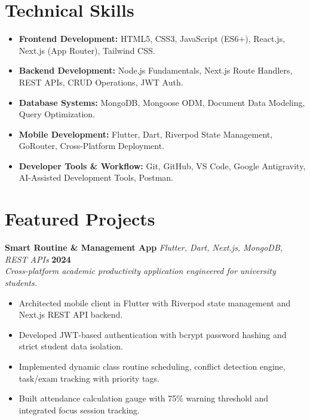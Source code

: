 \documentclass[10pt,a4paper]{article}
\begin{document}
\section{Technical Skills}
\begin{itemize}
    \item \textbf{Frontend Development:} HTML5, CSS3, JavaScript (ES6+), React.js, Next.js (App Router), Tailwind CSS.
    \item \textbf{Backend Development:} Node.js Fundamentals, Next.js Route Handlers, REST APIs, CRUD Operations, JWT Auth.
    \item \textbf{Database Systems:} MongoDB, Mongoose ODM, Document Data Modeling, Query Optimization.
    \item \textbf{Mobile Development:} Flutter, Dart, Riverpod State Management, GoRouter, Cross-Platform Deployment.
    \item \textbf{Developer Tools \& Workflow:} Git, GitHub, VS Code, Google Antigravity, AI-Assisted Development Tools, Postman.
\end{itemize}

\section{Featured Projects}
\textbf{Smart Routine \& Management App} \textbar{} \textit{Flutter, Dart, Next.js, MongoDB, REST APIs} \hfill \textbf{2024} \\
\textit{Cross-platform academic productivity application engineered for university students.}
\begin{itemize}
    \item Architected mobile client in Flutter with Riverpod state management and Next.js REST API backend.
    \item Developed JWT-based authentication with bcrypt password hashing and strict student data isolation.
    \item Implemented dynamic class routine scheduling, conflict detection engine, task/exam tracking with priority tags.
    \item Built attendance calculation gauge with 75\% warning threshold and integrated focus session tracking.
\end{itemize}
\end{document}
